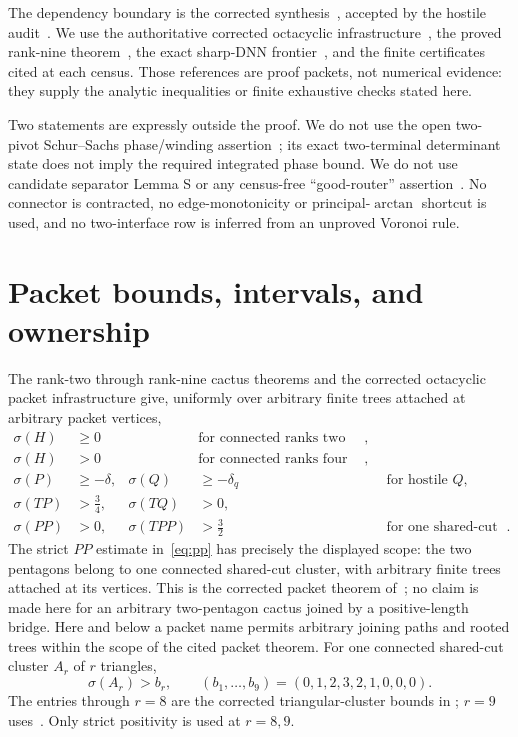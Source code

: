 \documentclass[11pt]{article}
\newcommand{\sig}{\sigma}
\begin{document}
The dependency boundary is the corrected synthesis~\cite{Synthesis}, accepted
by the hostile audit~\cite{HostileAudit}.  We use the authoritative corrected
octacyclic infrastructure~\cite{Octacyclic}, the proved rank-nine
theorem~\cite{Nonacyclic}, the exact sharp-DNN frontier~\cite{DNNResidual}, and
the finite certificates cited at each census.  Those references are proof
packets, not numerical evidence: they supply the analytic inequalities or
finite exhaustive checks stated here.

Two statements are expressly outside the proof.  We do not use the open
two-pivot Schur--Sachs phase/winding assertion~\cite{TwoPivot}; its exact
two-terminal determinant state does not imply the required integrated phase
bound.  We do not use candidate separator Lemma S or any census-free
``good-router'' assertion~\cite{CandidateSeparator}.  No connector is
contracted, no edge-monotonicity or principal-$\arctan$ shortcut is used, and
no two-interface row is inferred from an unproved Voronoi rule.

\section{Packet bounds, intervals, and ownership}

The rank-two through rank-nine cactus theorems and the corrected octacyclic
packet infrastructure give, uniformly over arbitrary finite trees attached at
arbitrary packet vertices,
\begin{align}
 \sig(H)&\geq0 &&\text{for connected ranks two and three},\label{eq:low0}\\
 \sig(H)&>0 &&\text{for connected ranks four through nine},\label{eq:lowpos}\\
 \sig(P)&\geq-\delta,& \sig(Q)&\geq-\delta_q
   &&\text{for hostile $Q$},\label{eq:hostile}\\
 \sig(TP)&>\frac34,& \sig(TQ)&>0,\label{eq:mixed}\\
 \sig(PP)&>0,& \sig(TPP)&>\frac32
   &&\text{for one shared-cut cluster}.\label{eq:pp}
\end{align}
The strict $PP$ estimate in~\eqref{eq:pp} has precisely the displayed scope:
the two pentagons belong to one connected shared-cut cluster, with arbitrary
finite trees attached at its vertices.  This is the corrected packet theorem
of~\cite[Eq.~(2.5)]{Octacyclic}; no claim is made here for an arbitrary
two-pentagon cactus joined by a positive-length bridge.
Here and below a packet name permits arbitrary joining paths and rooted trees
within the scope of the cited packet theorem.  For one connected shared-cut
cluster $A_r$ of $r$ triangles,
\begin{equation}\label{eq:triangle}
 \sig(A_r)>b_r,
 \qquad (b_1,\ldots,b_9)=(0,1,2,3,2,1,0,0,0).
\end{equation}
The entries through $r=8$ are the corrected triangular-cluster bounds in
\cite{Octacyclic}; $r=9$ uses~\cite{Nonacyclic}.  Only strict positivity is
used at $r=8,9$.
\end{document}
